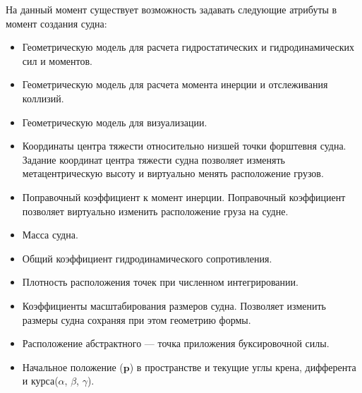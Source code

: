 На данный момент существует возможность задавать следующие атрибуты в момент создания судна:
\begin{itemize}
	\item	Геометрическую модель для расчета гидростатических и гидродинамических сил и моментов.
	\item	Геометрическую модель для расчета момента инерции и отслеживания коллизий.
	\item	Геометрическую модель для визуализации.
	\item	Координаты центра тяжести относительно низшей точки форштевня судна. 
			Задание координат центра тяжести судна позволяет изменять метацентрическую 
			высоту и виртуально менять расположение грузов.
	\item	Поправочный коэффициент к момент инерции. Поправочный коэффициент позволяет 
			виртуально изменить расположение груза на судне.
	\item	Масса судна.
	\item	Общий коэффициент гидродинамического сопротивления.
	\item	Плотность расположения точек при численном интегрировании.
	\item	Коэффициенты масштабирования размеров судна. 
			Позволяет изменить размеры судна сохраняя при этом геометрию формы.
	\item	Расположение абстрактного  --- точка приложения буксировочной силы.
	\item	Начальное положение ($\mathbf{p}$) в пространстве и текущие углы крена, дифферента и курса($\alpha$, $\beta$, $\gamma$).
\end{itemize}



